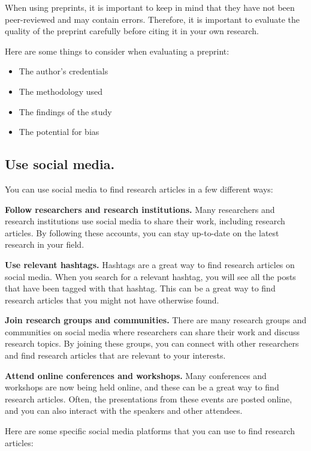 \documentclass[
]{book}
\begin{document}
When using preprints, it is important to keep in mind that they have not been peer-reviewed and may contain errors. Therefore, it is important to evaluate the quality of the preprint carefully before citing it in your own research.

Here are some things to consider when evaluating a preprint:

\begin{itemize}
\item
  The author's credentials
\item
  The methodology used
\item
  The findings of the study
\item
  The potential for bias
\end{itemize}

\subsection*{Use social media.}\label{use-social-media.}

You can use social media to find research articles in a few different ways:

\textbf{Follow researchers and research institutions.} Many researchers and research institutions use social media to share their work, including research articles. By following these accounts, you can stay up-to-date on the latest research in your field.

\textbf{Use relevant hashtags.} Hashtags are a great way to find research articles on social media. When you search for a relevant hashtag, you will see all the posts that have been tagged with that hashtag. This can be a great way to find research articles that you might not have otherwise found.

\textbf{Join research groups and communities.} There are many research groups and communities on social media where researchers can share their work and discuss research topics. By joining these groups, you can connect with other researchers and find research articles that are relevant to your interests.

\textbf{Attend online conferences and workshops.} Many conferences and workshops are now being held online, and these can be a great way to find research articles. Often, the presentations from these events are posted online, and you can also interact with the speakers and other attendees.

Here are some specific social media platforms that you can use to find research articles:
\end{document}
